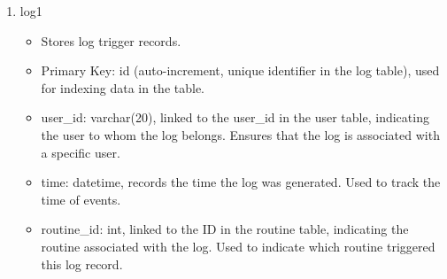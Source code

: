 \begin{enumerate}
\begin{enumerate}
                        \item log1
                              \begin{itemize}
                                  \item Stores log trigger records.
                                  \item Primary Key: id (auto-increment, unique identifier in the log table), used for indexing data in the table.
                                  \item user\_id: varchar(20), linked to the user\_id in the user table, indicating the user to whom the log belongs. Ensures that the log is associated with a specific user.
                                  \item time: datetime, records the time the log was generated. Used to track the time of events.
                                  \item routine\_id: int, linked to the ID in the routine table, indicating the routine associated with the log. Used to indicate which routine triggered this log record.\\
                              \end{itemize}


\end{enumerate}
\end{enumerate}

